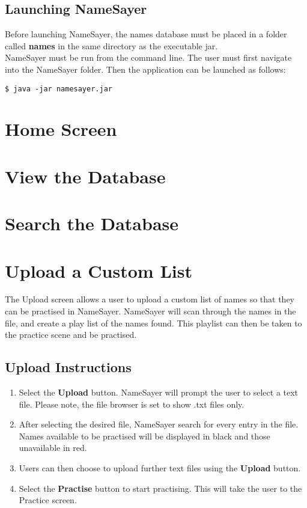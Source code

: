 \documentclass{article}
\begin{document}
\subsection{Launching NameSayer}
Before launching NameSayer, the names database must be placed in a folder called \textbf{names} in the same directory as 
the executable jar. \\

NameSayer must be run from the command line. The user must first navigate into the NameSayer folder. Then the application
can be launched as follows: 

\begin{verbatim}
$ java -jar namesayer.jar
\end{verbatim}

\section{Home Screen}

\section{View the Database}

\section{Search the Database}

\section{Upload a Custom List}
The Upload screen allows a user to upload a custom list of names so that they can be practised in NameSayer. 
NameSayer will scan through the names in the file, and create a play list of the names found. This playlist can then be taken to the practice scene and be practised.

\subsection{Upload Instructions}

\begin{enumerate}
	\item Select the \textbf{Upload} button. NameSayer will prompt the user to select a text file. Please note, the file browser is set to show .txt files only.

	\item After selecting the desired file, NameSayer search for every entry in the file. Names available to be practised will be displayed in black and those unavailable in red. 

	\item Users can then choose to upload further text files using the \textbf{Upload} button.

	\item Select the \textbf{Practise} button to start practising. This will take the user to the Practice screen.

\end{enumerate}
\end{document}

